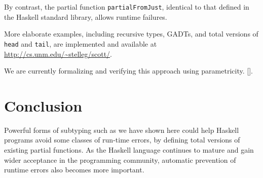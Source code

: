 \documentclass[]{article}
\newenvironment{Shaded}{}{}
\newcommand{\DataTypeTok}[1]{\textcolor[rgb]{0.56,0.13,0.00}{{#1}}}
\newcommand{\StringTok}[1]{\textcolor[rgb]{0.25,0.44,0.63}{{#1}}}
\newcommand{\OtherTok}[1]{\textcolor[rgb]{0.00,0.44,0.13}{{#1}}}
\newcommand{\FunctionTok}[1]{\textcolor[rgb]{0.02,0.16,0.49}{{#1}}}
\newcommand{\NormalTok}[1]{{#1}}
\begin{document}
By contrast, the partial function \texttt{partialFromJust}, identical to
that defined in the Haskell standard library, allows runtime failures.

\begin{Shaded}
\end{Shaded}

More elaborate examples, including recursive types, GADTs, and total
versions of \texttt{head} and \texttt{tail}, are implemented and
available at \url{http://cs.unm.edu/~stelleg/scott/}.

We are currently formalizing and verifying this approach using
parametricity. {[}\cite{wadler1989theorems}{]}.

\section{Conclusion}\label{conclusion}

Powerful forms of subtyping such as we have shown here could help
Haskell programs avoid some classes of run-time errors, by defining
total versions of existing partial functions. As the Haskell language
continues to mature and gain wider acceptance in the programming
community, automatic prevention of runtime errors also becomes more
important.


\end{document}
